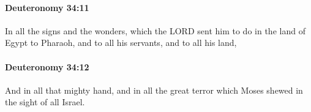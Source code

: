 		\paragraph{Deuteronomy 34:11} %
			\label{DEUTERONOMY-34-11}

			In all the signs and the wonders, which the LORD sent him to do in the land of Egypt to Pharaoh, and to all his servants, and to all his land,


		\paragraph{Deuteronomy 34:12} %
			\label{DEUTERONOMY-34-12}

			And in all that mighty hand, and in all the great terror which Moses shewed in the sight of all Israel.

